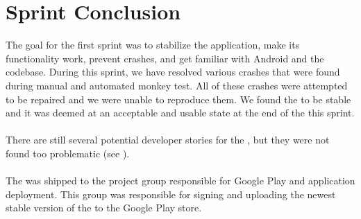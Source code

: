 
\chapter{Sprint Conclusion}
\label{cha:conclusion_sprint_1}

The goal for the first sprint was to stabilize the \launcher application, make its functionality work, prevent crashes, and get familiar with Android and the codebase. During this sprint, we have resolved various crashes that were found during manual and automated monkey test. All of these crashes were attempted to be repaired and we were unable to reproduce them. We found the \launcher to be stable and it was deemed at an acceptable and usable state at the end of the this sprint.
\\\\
There are still several potential developer stories for the \launcher, but they were not found too problematic (see ).
\\\\
The \launcher was shipped to the project group responsible for Google Play and application deployment. This group was responsible for signing \parencite{android_app_signing} and uploading the newest stable version of the \launcher to the Google Play store.